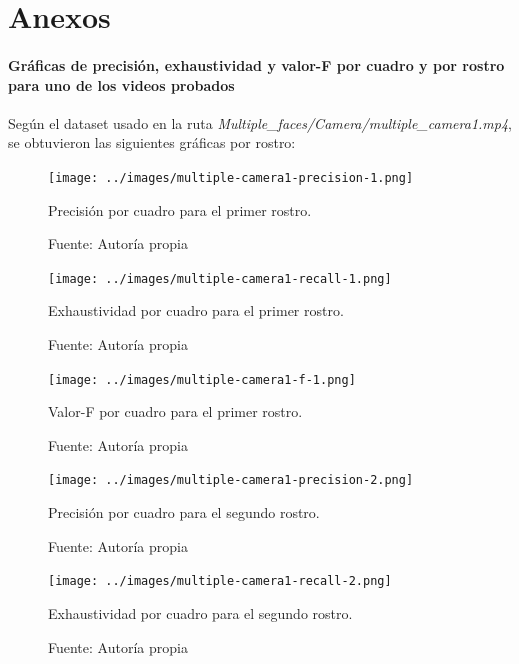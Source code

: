 \documentclass[a4paper,openright,12pt]{report}
\begin{document}
\chapter{Anexos}
\subsubsection{Gráficas de precisión, exhaustividad y valor-F por cuadro y por
               rostro para uno de los videos probados}

    Según el dataset usado en la ruta
    \textit{Multiple\_faces/Camera/multiple\_camera1.mp4}, se obtuvieron las
    siguientes gráficas por rostro:

    \begin{figure}[h]
      \centering
        \texttt{[image: ../images/multiple-camera1-precision-1.png]}\par
      \caption{Precisión por cuadro para el primer rostro.}
        \label{fig:multiple-camera1-precision-1}
      \caption*{Fuente: Autoría propia}
    \end{figure}


    \begin{figure}[h]
      \centering
        \texttt{[image: ../images/multiple-camera1-recall-1.png]}\par
      \caption{Exhaustividad por cuadro para el primer rostro.}
        \label{fig:multiple-camera1-precision-1}
      \caption*{Fuente: Autoría propia}
    \end{figure}

    \begin{figure}[h]
      \centering
        \texttt{[image: ../images/multiple-camera1-f-1.png]}\par
      \caption{Valor-F por cuadro para el primer rostro.}
        \label{fig:multiple-camera1-precision-1}
      \caption*{Fuente: Autoría propia}
    \end{figure}

    \begin{figure}[h]
      \centering
        \texttt{[image: ../images/multiple-camera1-precision-2.png]}\par
      \caption{Precisión por cuadro para el segundo rostro.}
        \label{fig:multiple-camera1-precision-1}
      \caption*{Fuente: Autoría propia}
    \end{figure}


    \begin{figure}[h]
      \centering
        \texttt{[image: ../images/multiple-camera1-recall-2.png]}\par
      \caption{Exhaustividad por cuadro para el segundo rostro.}
        \label{fig:multiple-camera1-precision-1}
      \caption*{Fuente: Autoría propia}
    \end{figure}
\end{document}
